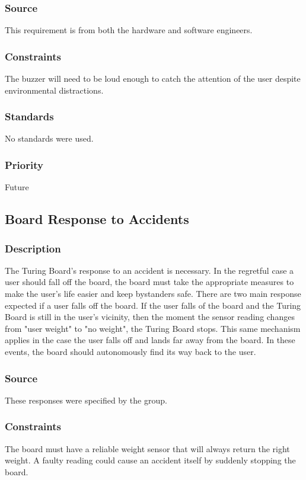 \subsubsection{Source}
This requirement is from both the hardware and software engineers.
\subsubsection{Constraints}
The buzzer will need to be loud enough to catch the attention of the user despite environmental distractions.
\subsubsection{Standards}
No standards were used.
\subsubsection{Priority}
Future

\subsection{Board Response to Accidents}
\subsubsection{Description}
The Turing Board's response to an accident is necessary. In the regretful case a user should fall off the board, the board must take the appropriate measures to make the user's life easier and keep bystanders safe. There are two main response expected if a user falls off the board. If the user falls of the board and the Turing Board is still in the user's vicinity, then the moment the sensor reading changes from "user weight" to "no weight", the Turing Board stops. This same mechanism applies in the case the user falls off and lands far away from the board. In these events, the board should autonomously find its way back to the user.
\subsubsection{Source}
These responses were specified by the group.
\subsubsection{Constraints}
The board must have a reliable weight sensor that will always return the right weight. A faulty reading could cause an accident itself by suddenly stopping the board.
